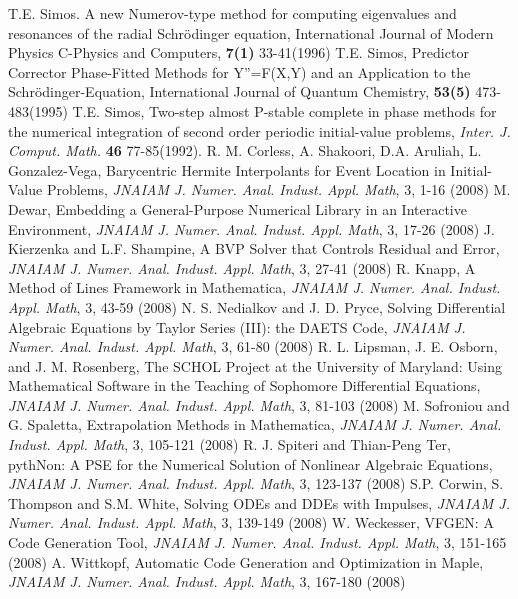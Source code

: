 \documentclass[numreferences]{kluwer}
\begin{document}
\begin{article}
\begin{thebibliography}{120}
 T.E. Simos. A new Numerov-type method for computing eigenvalues and resonances of the radial Schr\"odinger
equation, International Journal of Modern Physics C-Physics and
Computers, {\bf 7(1)} 33-41(1996)
 T.E. Simos, Predictor Corrector Phase-Fitted Methods for Y''=F(X,Y) and an Application to the
Schr\"odinger-Equation, International Journal of Quantum Chemistry,
{\bf 53(5)} 473-483(1995)
 T.E. Simos, Two-step almost P-stable complete
in phase methods for the numerical integration of second order
periodic initial-value problems, {\it Inter. J. Comput. Math.} {\bf
46} 77-85(1992).
 R. M. Corless, A. Shakoori, D.A. Aruliah, L. Gonzalez-Vega, Barycentric Hermite Interpolants for Event Location in Initial-Value Problems, {\it JNAIAM J. Numer. Anal. Indust. Appl. Math}, 3, 1-16 (2008)
 M. Dewar, Embedding a General-Purpose Numerical Library in an Interactive Environment, {\it JNAIAM J. Numer. Anal. Indust. Appl. Math}, 3, 17-26 (2008)
 J. Kierzenka and L.F. Shampine, A BVP Solver that Controls Residual and Error, {\it JNAIAM J. Numer. Anal. Indust. Appl. Math}, 3, 27-41 (2008)
 R. Knapp, A Method of Lines Framework in Mathematica, {\it JNAIAM J. Numer. Anal. Indust. Appl. Math}, 3, 43-59 (2008)
 N. S. Nedialkov and J. D. Pryce, Solving Differential Algebraic Equations by Taylor Series (III): the DAETS Code, {\it JNAIAM J. Numer. Anal. Indust. Appl. Math}, 3, 61-80 (2008)
 R. L. Lipsman, J. E. Osborn, and J. M. Rosenberg, The SCHOL Project at the University of Maryland: Using Mathematical Software in the Teaching of Sophomore Differential Equations, {\it JNAIAM J. Numer. Anal. Indust. Appl. Math}, 3, 81-103 (2008)
 M. Sofroniou and G. Spaletta, Extrapolation Methods in Mathematica, {\it JNAIAM J. Numer. Anal. Indust. Appl. Math}, 3, 105-121 (2008)
 R. J. Spiteri and Thian-Peng Ter, pythNon: A PSE for the Numerical Solution of Nonlinear Algebraic Equations, {\it JNAIAM J. Numer. Anal. Indust. Appl. Math}, 3, 123-137 (2008)
 S.P. Corwin, S. Thompson and S.M. White, Solving ODEs and DDEs with Impulses, {\it JNAIAM J. Numer. Anal. Indust. Appl. Math}, 3, 139-149 (2008)
 W. Weckesser, VFGEN: A Code Generation Tool, {\it JNAIAM J. Numer. Anal. Indust. Appl. Math}, 3, 151-165 (2008)
 A. Wittkopf, Automatic Code Generation and Optimization in Maple, {\it JNAIAM J. Numer. Anal. Indust. Appl. Math}, 3, 167-180 (2008)

\end{thebibliography}

\end{article}
\end{document}
